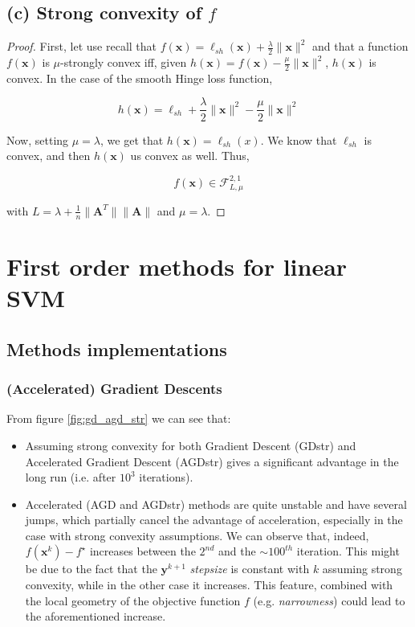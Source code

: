 \documentclass[12pt]{article}
\newcommand{\xb}{\mathbf{x}}
\newcommand{\yb}{\mathbf{y}}
\newcommand{\xnorm}{\lVert \mathbf{\xb} \rVert}
\newcommand{\ellsh}{\ell_{sh}}
\newcommand{\fracn}{\frac{1}{n}}
\begin{document}
\subsection*{(c) Strong convexity of $f$}
\begin{proof}
First, let use recall that $f(\xb) = \ellsh(\xb) + \frac{\lambda}{2} \xnorm^2$ and that a function $f(\xb)$ is $\mu$-strongly convex iff, given $h(\xb) = f(\xb) - \frac{\mu}{2} \xnorm^2$, $h(\xb)$ is convex. In the case of the smooth Hinge loss function,

\begin{equation}
    h(\xb) = \ellsh + \frac{\lambda}{2} \xnorm^2 - \frac{\mu}{2} \xnorm^2
\end{equation}

Now, setting $\mu = \lambda$, we get that $h(\xb) = \ellsh(x)$. We know that $\ellsh$ is convex, and then $h(\xb)$ us convex as well. Thus,

\begin{equation}
    f(\xb) \in \mathcal{F}_{L, \mu}^{2, 1}
\end{equation}

with $L = \lambda + \fracn \lVert \mathbf{A}^T \rVert \lVert \mathbf{A} \rVert$ and $\mu = \lambda$.

\end{proof}

\section{First order methods for linear SVM}
\subsection*{Methods implementations}
\subsubsection*{(Accelerated) Gradient Descents}
From figure \ref{fig:gd_agd_str} we can see that:
\begin{itemize}
    \item Assuming strong convexity for both Gradient Descent (GDstr) and Accelerated Gradient Descent (AGDstr) gives a significant advantage in the long run (i.e. after $10^3$ iterations).
    \item Accelerated (AGD and AGDstr) methods are quite unstable and have several jumps, which partially cancel the advantage of acceleration, especially in the case with strong convexity assumptions. We can observe that, indeed, $f(\xb^k) - f^{\star}$ increases between the $2^{nd}$ and the $\sim 100^{th}$ iteration. This might be due to the fact that the $\yb^{k+1}$ \emph{stepsize} is constant with $k$ assuming strong convexity, while in the other case it increases. This feature, combined with the local geometry of the objective function $f$ (e.g. \emph{narrowness}) could lead to the aforementioned increase.
\end{itemize}
\end{document}
